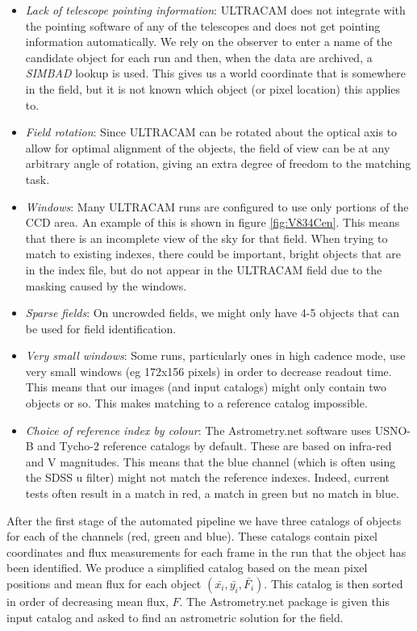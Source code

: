 \begin{itemize}
	\item \emph{Lack of telescope pointing information}: ULTRACAM does not integrate with the pointing software of any of the telescopes and does not get pointing information automatically. We rely on the observer to enter a name of the candidate object for each run and then, when the data are archived, a \emph{SIMBAD} lookup is used. This gives us a world coordinate that is somewhere in the field, but it is not known which object (or pixel location) this applies to.  
	\item \emph{Field rotation}: Since ULTRACAM can be rotated about the optical axis to allow for optimal alignment of the objects, the field of view can be at any arbitrary angle of rotation, giving an extra degree of freedom to the matching task. 
	\item \emph{Windows}: Many ULTRACAM runs are configured to use only portions of the CCD area. An example of this is shown in figure \ref{fig:V834Cen}. This means that there is an incomplete view of the sky for that field. When trying to match to existing indexes, there could be important, bright objects that are in the index file, but do not appear in the ULTRACAM field due to the masking caused by the windows.
	\item \emph{Sparse fields}: On uncrowded fields, we might only have 4-5 objects that can be used for field identification. 
	\item \emph{Very small windows}: Some runs, particularly ones in high cadence mode, use very small windows (eg 172x156 pixels) in order to decrease readout time. This means that our images (and input catalogs) might only contain two objects or so. This makes matching to a reference catalog impossible. 
	\item \emph{Choice of reference index by colour}: The Astrometry.net software uses USNO-B and Tycho-2 reference catalogs by default. These are based on infra-red and V magnitudes. This means that the blue channel (which is often using the SDSS u filter) might not match the reference indexes. Indeed, current tests often result in a match in red, a match in green but no match in blue. 
\end{itemize}

After the first stage of the automated pipeline we have three catalogs of objects for each of the channels (red, green and blue). These catalogs contain pixel coordinates and flux measurements for each frame in the run that the object has been identified. We produce a simplified catalog based on the mean pixel positions and mean flux for each object $(\bar{x_i}, \bar{y_i}, \bar{F_i})$. This catalog is then sorted in order of decreasing mean flux, $F$. The Astrometry.net package is given this input catalog and asked to find an astrometric solution for the field. 

